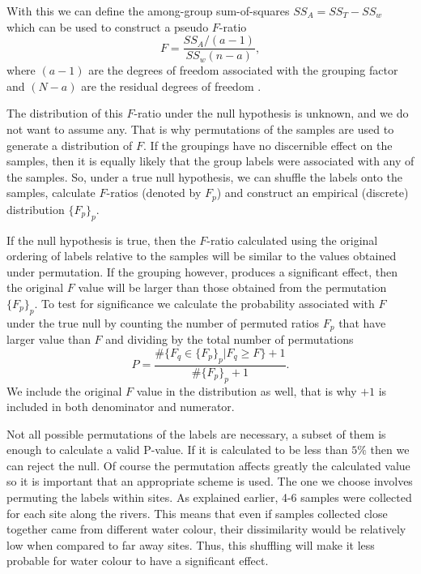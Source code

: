 With this we can define the among-group sum-of-squares $SS_A = SS_T - SS_w$ which can be used to construct a pseudo $F$-ratio
\begin{equation}
F=	\frac{SS_A/(a-1)}{SS_w (n-a)}, 
\end{equation}
where $(a-1)$ are the degrees of freedom associated with the grouping factor and $(N-a)$ are the residual degrees of freedom \cite{anderson_permutational_2005}. 

The distribution of this $F$-ratio under the null hypothesis is unknown, and we do not want to assume any. That is why permutations of the samples are used to generate a distribution of $F$. If the groupings have no discernible effect on the samples, then it is equally likely that the group labels were associated with any of the samples. So, under a true null hypothesis, we can shuffle the labels onto the samples, calculate $F$-ratios (denoted by $F_p$) and construct an empirical (discrete) distribution $\{F_p\}_p$.

If the null hypothesis is true, then the $F$-ratio calculated using the original ordering of labels relative to the samples will be similar to the values obtained under permutation. If the grouping however, produces a significant effect, then the original $F$ value will be larger than those obtained from the permutation $\{F_p\}_p$. To test for significance we calculate the probability associated with $F$ under the true null by counting the number of permuted ratios $F_p$ that have larger value than $F$ and dividing by the total number of permutations
\begin{equation}
	P = \frac{\#\{F_q\in\{F_p\}_p| F_q \geq F \}+1}{\#\{F_p\}_p+1}.
\end{equation}  
We include the original $F$ value in the distribution as well, that is why $+1$ is included in both denominator and numerator.


Not all possible permutations of the labels are necessary, a subset of them is enough to calculate a valid P-value. If it is calculated to be less than $5\%$ then we can reject the null. Of course the permutation affects greatly the calculated value so it is important that an appropriate scheme is used. The one we choose involves permuting the labels within sites. As explained earlier,  4-6 samples were collected for each site along the rivers. This means that even if samples collected close together came from different water colour, their dissimilarity would be relatively low when compared to far away sites. Thus, this shuffling will make it less probable for water colour to have a significant effect. 

